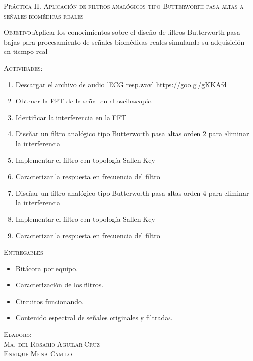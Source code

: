 \documentclass[10pt,letterpaper,spanish,twoside]{report}
\begin{document}
\docdate

\begin{center}
 \textsc{\asignatura}\vspace{.2em}
\end{center}

\textsc{Práctica II. Aplicación de filtros analógicos tipo Butterworth pasa altas a señales biomédicas reales}

\textsc{Objetivo:}Aplicar los conocimientos sobre el diseño de filtros Butterworth pasa bajas para procesamiento de señales biomédicas reales simulando su adquisición en tiempo real

\textsc{Actividades:}
\begin{enumerate}
  \item Descargar el archivo de audio 'ECG$\_$resp.wav' https://goo.gl/gKKAfd
  \item Obtener la FFT de la señal en el osciloscopio
  \item Identificar la interferencia en la FFT
  \item Diseñar un filtro analógico tipo Butterworth pasa altas orden 2 para eliminar la interferencia
  \item Implementar el filtro con topología Sallen-Key
  \item Caracterizar la respuesta en frecuencia del filtro
  \item Diseñar un filtro analógico tipo Butterworth pasa altas orden 4 para eliminar la interferencia
  \item Implementar el filtro con topología Sallen-Key
  \item Caracterizar la respuesta en frecuencia del filtro
\end{enumerate}

\textsc{Entregables}
\begin{itemize}
  \item Bitácora por equipo.
  \item Caracterización de los filtros.
  \item Circuitos funcionando.
  \item Contenido espectral de señales originales y filtradas.
\end{itemize}


\vfill
\begin{flushright}
\textsc{Elaboró:\\
Ma. del Rosario Aguilar Cruz\\
Enrique Mena Camilo}
\end{flushright}
\end{document}
